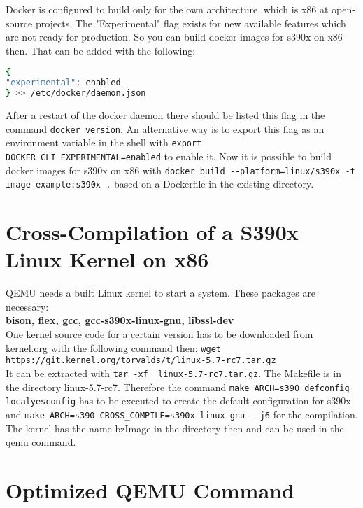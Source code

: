 Docker is configured to build only for the own architecture, which is x86 at open-source projects. The "Experimental" flag exists for new available features which are not ready for production. So you can build docker images for s390x on x86 then. That can be added with the following:

\begin{lstlisting}[language=bash,caption={Docker Experimental Flag},captionpos=b]
{
"experimental": enabled
} >> /etc/docker/daemon.json
\end{lstlisting}

After a restart of the docker daemon there should be listed this flag in the command  \lstinline!docker version!. An alternative way is to export this flag as an environment variable in the shell with  \lstinline!export DOCKER_CLI_EXPERIMENTAL=enabled! to enable it. Now it is possible to build docker images for s390x on x86 with  \lstinline!docker build --platform=linux/s390x -t image-example:s390x .! based on a Dockerfile in the existing directory.

 

 

\section{Cross-Compilation of a S390x Linux Kernel on x86}

QEMU needs a built Linux kernel to start a system. These packages are necessary: \\
\textbf{bison, flex, gcc, gcc-s390x-linux-gnu, libssl-dev} \\
One kernel source code for a certain version has to be downloaded from \url{kernel.org} with the following command then:  \lstinline!wget https://git.kernel.org/torvalds/t/linux-5.7-rc7.tar.gz!\\
It can be extracted with \lstinline!tar -xf  linux-5.7-rc7.tar.gz!. The Makefile is in the directory linux-5.7-rc7. Therefore the command \lstinline!make ARCH=s390 defconfig localyesconfig! has to be executed to create the default configuration for s390x and  \lstinline!make ARCH=s390 CROSS_COMPILE=s390x-linux-gnu- -j6! for the compilation. The kernel has the name bzImage in the directory  then and can be used in the qemu command.

\section{Optimized QEMU Command}\label{Optimized-Qemu-Command}

